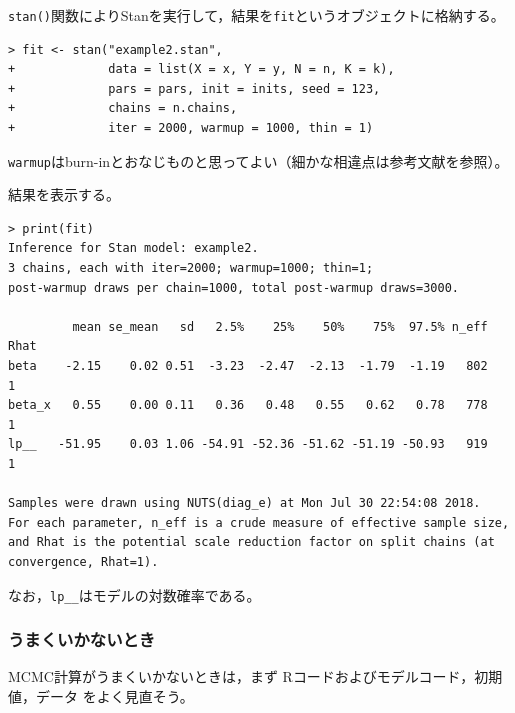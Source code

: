 \documentclass[11pt,uplatex]{jsarticle}
\begin{document}
\texttt{stan()}関数により\textsf{Stan}を実行して，結果を\texttt{fit}というオブジェクトに格納する。
\begin{lstlisting}
> fit <- stan("example2.stan",
+             data = list(X = x, Y = y, N = n, K = k),
+             pars = pars, init = inits, seed = 123,
+             chains = n.chains,
+             iter = 2000, warmup = 1000, thin = 1)
\end{lstlisting}
\noindent
\texttt{warmup}はburn-inとおなじものと思ってよい（細かな相違点は参考文献\cite{BDA3}を参照）。

結果を表示する。
\begin{lstlisting}[basicstyle=\ttfamily\footnotesize]
> print(fit)
Inference for Stan model: example2.
3 chains, each with iter=2000; warmup=1000; thin=1; 
post-warmup draws per chain=1000, total post-warmup draws=3000.

         mean se_mean   sd   2.5%    25%    50%    75%  97.5% n_eff Rhat
beta    -2.15    0.02 0.51  -3.23  -2.47  -2.13  -1.79  -1.19   802    1
beta_x   0.55    0.00 0.11   0.36   0.48   0.55   0.62   0.78   778    1
lp__   -51.95    0.03 1.06 -54.91 -52.36 -51.62 -51.19 -50.93   919    1

Samples were drawn using NUTS(diag_e) at Mon Jul 30 22:54:08 2018.
For each parameter, n_eff is a crude measure of effective sample size,
and Rhat is the potential scale reduction factor on split chains (at 
convergence, Rhat=1).
\end{lstlisting}
\noindent
なお，\texttt{lp\_\_}はモデルの対数確率である。

\subsubsection{うまくいかないとき}
MCMC計算がうまくいかないときは，まず \textsf{R}コードおよびモデルコード，初期値，データ
をよく見直そう。
\end{document}
